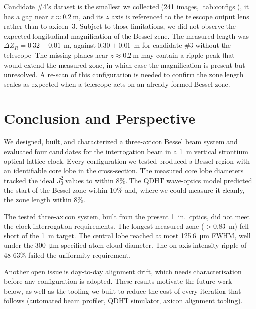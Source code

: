 \documentclass[
  aps,
  twocolumn,
  reprint,              %
  superscriptaddress,
  amsmath,
  amssymb,
  floatfix,
  longbibliography,      %
  nofootinbib %
]{revtex4-2}
\begin{document}
Candidate \#4's dataset is the smallest we collected (241 images,
\autoref{tab:configs}), it has a gap near $z \approx \SI{0.2}{\meter}$,
and its $z$ axis is referenced to the telescope output lens rather than
to axicon~3. Subject to those limitations, we did not observe the
expected longitudinal magnification of the Bessel zone. The measured
length was $\Delta Z_R = 0.32 \pm 0.01$~m, against
$0.30 \pm 0.01$~m for candidate \#3 without the telescope. The missing planes near
$z \approx \SI{0.2}{\meter}$ may contain a ripple peak that would extend
the measured zone, in which case the magnification is present but
unresolved. A re-scan of this configuration is needed to confirm the zone length scales as expected when a telescope acts on an already-formed Bessel zone.

\section{Conclusion and Perspective}
We designed, built, and characterized a three-axicon Bessel beam
system and evaluated four candidates for the interrogation beam in a \SI{1}{\meter}
vertical strontium optical lattice clock. Every configuration we tested
produced a Bessel region with an identifiable core lobe in the cross-section. The measured core lobe diameters tracked
the ideal $J_0^2$ values to within 8\%. The QDHT wave-optics model predicted the start of the Bessel zone within 10\% and, where we could measure it cleanly, the zone length within 8\%.

The tested three-axicon system, built from the present 1~in.\ optics,
did not meet the clock-interrogation requirements. The longest measured
zone (${>}0.83$~m) fell short of the \SI{1}{\meter} target. The central
lobe reached at most \SI{125.6}{\micro\meter} FWHM, well under the
\SI{300}{\micro\meter} specified atom cloud diameter. The on-axis
intensity ripple of 48-63\% failed the uniformity requirement.

Another open issue is day-to-day alignment drift, which needs characterization before any configuration is adopted. These results motivate the future work below,
as well as the tooling we built to reduce the cost of every iteration
that follows (automated beam profiler, QDHT simulator, axicon alignment
tooling).
\end{document}
